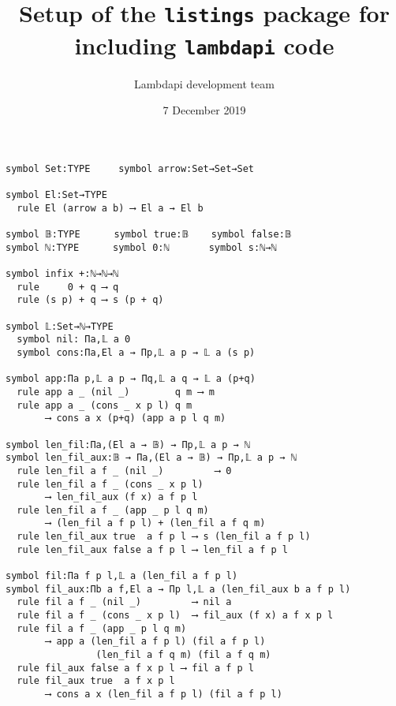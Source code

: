 \documentclass{article}
\title{Setup of the {\tt listings} package for including {\tt lambdapi} code}
\author{Lambdapi development team}
\date{7 December 2019}
\begin{document}
\maketitle

\small
\begin{lstlisting}
symbol Set:TYPE     symbol arrow:Set→Set→Set

symbol El:Set→TYPE
  rule El (arrow a b) ⟶ El a → El b

symbol 𝔹:TYPE      symbol true:𝔹    symbol false:𝔹
symbol ℕ:TYPE      symbol 0:ℕ       symbol s:ℕ→ℕ

symbol infix +:ℕ→ℕ→ℕ
  rule     0 + q ⟶ q
  rule (s p) + q ⟶ s (p + q)

symbol 𝕃:Set→ℕ→TYPE
  symbol nil: Πa,𝕃 a 0
  symbol cons:Πa,El a → Πp,𝕃 a p → 𝕃 a (s p)

symbol app:Πa p,𝕃 a p → Πq,𝕃 a q → 𝕃 a (p+q)
  rule app a _ (nil _)        q m ⟶ m
  rule app a _ (cons _ x p l) q m
       ⟶ cons a x (p+q) (app a p l q m)

symbol len_fil:Πa,(El a → 𝔹) → Πp,𝕃 a p → ℕ
symbol len_fil_aux:𝔹 → Πa,(El a → 𝔹) → Πp,𝕃 a p → ℕ
  rule len_fil a f _ (nil _)         ⟶ 0
  rule len_fil a f _ (cons _ x p l)
       ⟶ len_fil_aux (f x) a f p l
  rule len_fil a f _ (app _ p l q m)
       ⟶ (len_fil a f p l) + (len_fil a f q m)
  rule len_fil_aux true  a f p l ⟶ s (len_fil a f p l)
  rule len_fil_aux false a f p l ⟶ len_fil a f p l

symbol fil:Πa f p l,𝕃 a (len_fil a f p l)
symbol fil_aux:Πb a f,El a → Πp l,𝕃 a (len_fil_aux b a f p l)
  rule fil a f _ (nil _)         ⟶ nil a
  rule fil a f _ (cons _ x p l)  ⟶ fil_aux (f x) a f x p l
  rule fil a f _ (app _ p l q m)
       ⟶ app a (len_fil a f p l) (fil a f p l)
                (len_fil a f q m) (fil a f q m)
  rule fil_aux false a f x p l ⟶ fil a f p l
  rule fil_aux true  a f x p l
       ⟶ cons a x (len_fil a f p l) (fil a f p l)
\end{lstlisting}
\end{document}
